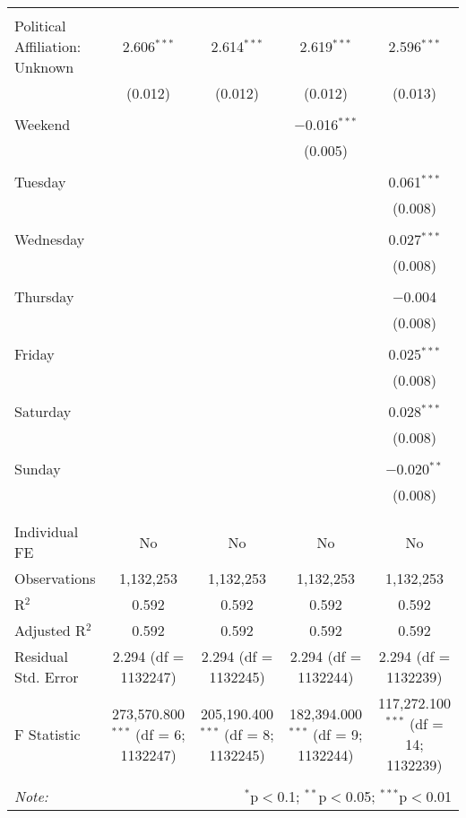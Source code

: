 \documentclass[
]{article}
\begin{document}
\begin{table}[!htbp]
{\begin{tabular}{@{\extracolsep{5pt}}lcccc}
  & & & & \\ 
 Political Affiliation: Unknown & 2.606$^{***}$ & 2.614$^{***}$ & 2.619$^{***}$ & 2.596$^{***}$ \\ 
  & (0.012) & (0.012) & (0.012) & (0.013) \\ 
  & & & & \\ 
 Weekend &  &  & $-$0.016$^{***}$ &  \\ 
  &  &  & (0.005) &  \\ 
  & & & & \\ 
 Tuesday &  &  &  & 0.061$^{***}$ \\ 
  &  &  &  & (0.008) \\ 
  & & & & \\ 
 Wednesday &  &  &  & 0.027$^{***}$ \\ 
  &  &  &  & (0.008) \\ 
  & & & & \\ 
 Thursday &  &  &  & $-$0.004 \\ 
  &  &  &  & (0.008) \\ 
  & & & & \\ 
 Friday &  &  &  & 0.025$^{***}$ \\ 
  &  &  &  & (0.008) \\ 
  & & & & \\ 
 Saturday &  &  &  & 0.028$^{***}$ \\ 
  &  &  &  & (0.008) \\ 
  & & & & \\ 
 Sunday &  &  &  & $-$0.020$^{**}$ \\ 
  &  &  &  & (0.008) \\ 
  & & & & \\ 
\hline \\[-1.8ex] 
Individual FE & No & No & No & No \\ 
Observations & 1,132,253 & 1,132,253 & 1,132,253 & 1,132,253 \\ 
R$^{2}$ & 0.592 & 0.592 & 0.592 & 0.592 \\ 
Adjusted R$^{2}$ & 0.592 & 0.592 & 0.592 & 0.592 \\ 
Residual Std. Error & 2.294 (df = 1132247) & 2.294 (df = 1132245) & 2.294 (df = 1132244) & 2.294 (df = 1132239) \\ 
F Statistic & 273,570.800$^{***}$ (df = 6; 1132247) & 205,190.400$^{***}$ (df = 8; 1132245) & 182,394.000$^{***}$ (df = 9; 1132244) & 117,272.100$^{***}$ (df = 14; 1132239) \\ 
\hline 
\hline \\[-1.8ex] 
\textit{Note:}  & \multicolumn{4}{r}{$^{*}$p$<$0.1; $^{**}$p$<$0.05; $^{***}$p$<$0.01} \\ 
\end{tabular}
} 
\end{table} 
\newpage
\end{document}
